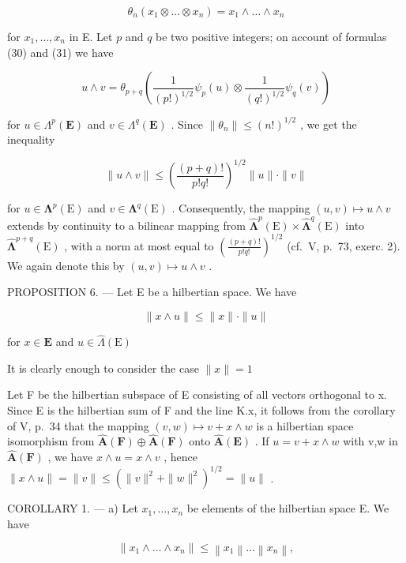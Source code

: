 \[
\theta_ {n} (x _ {1} \otimes \ldots \otimes x _ {n}) = x _ {1} \wedge \ldots \wedge x _ {n}\tag{31}
\]

for \(x_{1}, \ldots, x_{n}\) in E. Let \(p\) and \(q\) be two positive integers; on account of formulas (30) and (31) we have

\[
u \wedge v = \theta_ {p + q} \left(\frac {1}{(p !) ^ {1 / 2}} \psi_ {p} (u) \otimes \frac {1}{(q !) ^ {1 / 2}} \psi_ {q} (v)\right)\tag{32}
\]

for \(u \in \Lambda^p(\mathbf{E})\) and \(v \in \Lambda^q(\mathbf{E})\) . Since \(\| \theta_n \| \leqslant (n!)^{1/2}\) , we get the inequality

\[
\| u \wedge v \| \leqslant \left(\frac {(p + q) !}{p ! q !}\right) ^ {1 / 2} \| u \| \cdot \| v \|\tag{33}
\]

for \(u \in \symbf{\Lambda}^p(\mathrm{E})\) and \(v \in \symbf{\Lambda}^q(\mathrm{E})\) . Consequently, the mapping \((u, v) \mapsto u \wedge v\) extends by continuity to a bilinear mapping from \(\hat{\symbf{\Lambda}}^p(\mathrm{E}) \times \hat{\symbf{\Lambda}}^q(\mathrm{E})\) into \(\hat{\symbf{\Lambda}}^{p + q}(\mathrm{E})\) , with a norm at most equal to \(\left(\frac{(p + q)!}{p!q!}\right)^{1/2}\) (cf.~V, p.~73, exerc. 2). We again denote this by \((u, v) \mapsto u \wedge v\) .

PROPOSITION 6. --- Let E be a hilbertian space. We have

\[
\| x \wedge u \| \leqslant \| x \| \cdot \| u \|\tag{34}
\]

for \(x\in \mathbf{E}\) and \(u\in \hat{\Lambda} (\mathrm{E})\)

It is clearly enough to consider the case \(\| x\| = 1\)

Let F be the hilbertian subspace of E consisting of all vectors orthogonal to x. Since E is the hilbertian sum of F and the line K.x, it follows from the corollary of V, p.~34 that the mapping \((v,w)\mapsto v+x\wedge w\) is a hilbertian space isomorphism from \(\hat{\mathbf{A}}(\mathbf{F})\oplus\hat{\mathbf{A}}(\mathbf{F})\) onto \(\hat{\mathbf{A}}(\mathbf{E})\) . If \(u=v+x\wedge w\) with v,w in \(\hat{\mathbf{A}}(\mathbf{F})\) , we have \(x\wedge u=x\wedge v\) , hence \(\|x\wedge u\|=\|v\|\leqslant(\|v\|^{2}+\|w\|^{2})^{1/2}=\|u\|\) .

COROLLARY 1. --- a) Let \(x_1, \ldots, x_n\) be elements of the hilbertian space E. We have

\[
\left\| x _ {1} \wedge \dots \wedge x _ {n} \right\| \leqslant \left\| x _ {1} \right\| \dots \left\| x _ {n} \right\|,\tag{35}
\]

